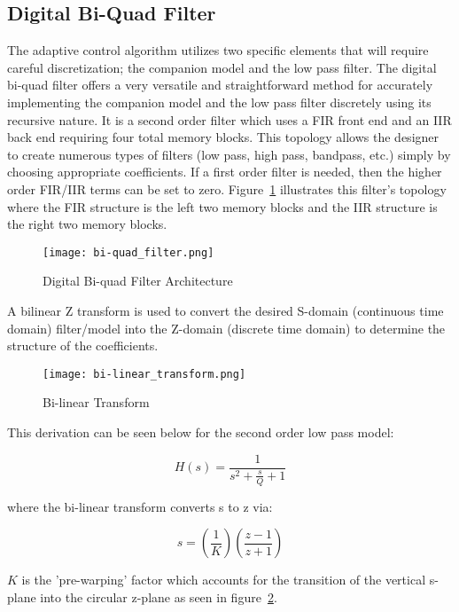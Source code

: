 \subsection{Digital Bi-Quad Filter}

The \Lone adaptive control algorithm utilizes two specific elements that will require careful discretization; the companion model and the low pass filter.  The digital bi-quad filter offers a very versatile and straightforward method for accurately implementing the companion model and the low pass filter discretely using its recursive nature.  It is a second order filter which uses a \ac{FIR} front end and an \ac{IIR} back end requiring four total memory blocks.  This topology allows the designer to create numerous types of filters (low pass, high pass, bandpass, etc.) simply by choosing appropriate coefficients.  If a first order filter is needed, then the higher order FIR/IIR terms can be set to zero.  Figure~\ref{fig:bi-quad} illustrates this filter's topology where the \ac{FIR} structure is the left two memory blocks and the \ac{IIR} structure is the right two memory blocks.

\begin{figure}[h!]
 \centering
  \texttt{[image: bi-quad\_filter.png]}
  \caption{Digital Bi-quad Filter Architecture }
  \label{fig:bi-quad}
\end{figure}

A bilinear Z transform is used to convert the desired S-domain (continuous time domain) filter/model into the Z-domain (discrete time domain) to determine the structure of the coefficients.

\begin{figure}[h!]
 \centering
  \texttt{[image: bi-linear\_transform.png]}
  \caption{Bi-linear Transform}
  \label{fig:bi-linear_transform}
\end{figure}

This derivation can be seen below for the second order low pass model:

\begin{equation}
 H(s) = \frac{1}{s^2+\frac{s}{Q}+1}
\end{equation}

where the bi-linear transform converts s to z via:

\begin{equation}
 s = \left(\frac{1}{K}\right)\left(\frac{z-1}{z+1}\right)
\end{equation}

$K$ is the 'pre-warping' factor which accounts for the transition of the vertical s-plane into the circular z-plane as seen in figure~\ref{fig:bi-linear_transform}.

